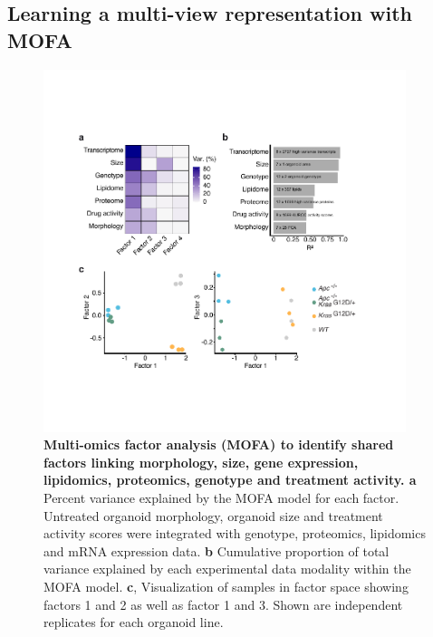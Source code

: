 \begin{flushleft}
\subsection{Learning a multi-view representation with MOFA}

\begin{figure}[h!]
\centering
\includegraphics[width=400,
                height=\textheight,
                keepaspectratio]{figures/adenomaprofiling/pdf/fig_1_7.pdf}
\caption[Multi-omics factor analysis (MOFA) to identify shared factors linking morphology, size, gene expression, lipidomics, proteomics, genotype and treatment activity]{\textbf{Multi-omics factor analysis (MOFA) to identify shared factors linking morphology, size, gene expression, lipidomics, proteomics, genotype and treatment activity. a} Percent variance explained by the MOFA model for each factor. Untreated organoid morphology, organoid size and treatment activity scores were integrated with genotype, proteomics, lipidomics and mRNA expression data. \textbf{b} Cumulative proportion of total variance explained by each experimental data modality within the MOFA model. \textbf{c}, Visualization of samples in factor space showing factors 1 and 2 as well as factor 1 and 3. Shown are independent replicates for each organoid line. 
}
\label{fig_170}
\end{figure}
\bigbreak


\end{flushleft}
